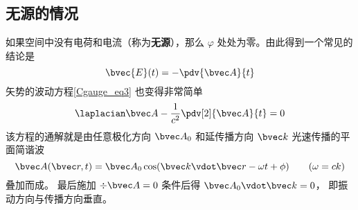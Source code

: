 \subsection{无源的情况}

如果空间中没有电荷和电流（称为\textbf{无源}），那么 $\varphi$ 处处为零。由此得到一个常见的结论是
\begin{equation}\label{Cgauge_eq2}
\bvec {E}(t) = -\pdv{\bvec A}{t}
\end{equation}
矢势的波动方程\autoref{Cgauge_eq3} 也变得非常简单
\begin{equation}
\laplacian \bvec A - \frac{1}{c^2} \pdv[2]{\bvec A}{t} = 0
\end{equation}
该方程的通解就是由任意极化方向 $\bvec A_0$ 和延传播方向 $\bvec k$ 光速传播的平面简谐波
\begin{equation}
\bvec A(\bvec r, t) = \bvec A_0 \cos(\bvec k \vdot \bvec r - \omega t + \phi) \qquad (\omega = ck)
\end{equation}
叠加而成。 最后施加 $\div \bvec A = 0$ 条件后得 $\bvec A_0 \vdot \bvec k = 0$， 即振动方向与传播方向垂直。
